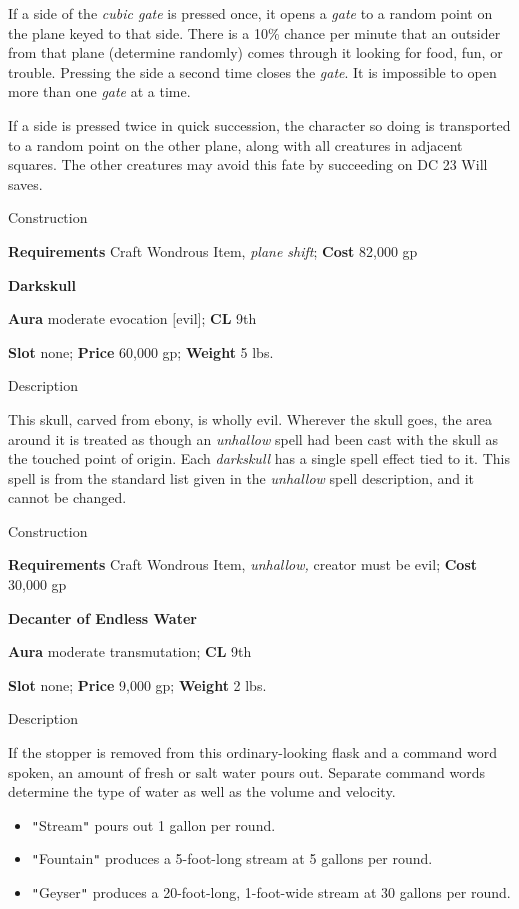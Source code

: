 If a side of the \textit{cubic gate }is pressed once, it opens a \textit{gate }to a random point on the plane keyed to that side. There is a 10\% chance per minute that an outsider from that plane (determine randomly) comes through it looking for food, fun, or trouble. Pressing the side a second time closes the \textit{gate}. It is impossible to open more than one \textit{gate }at a time.
				
If a side is pressed twice in quick succession, the character so doing is transported to a random point on the other plane, along with all creatures in adjacent squares. The other creatures may avoid this fate by succeeding on DC 23 Will saves. 
				
Construction
				
\textbf{Requirements} Craft Wondrous Item, \textit{plane shift}; \textbf{Cost }82,000 gp
				
\textbf{Darkskull}
				
\textbf{Aura} moderate evocation \mbox{$[$}evil\mbox{$]$};\textbf{ CL }9th
				
\textbf{Slot} none; \textbf{Price} 60,000 gp; \textbf{Weight} 5 lbs.
				
Description
				
This skull, carved from ebony, is wholly evil. Wherever the skull goes, the area around it is treated as though an \textit{unhallow }spell had been cast with the skull as the touched point of origin. Each \textit{darkskull }has a single spell effect tied to it. This spell is from the standard list given in the \textit{unhallow }spell description, and it cannot be changed. 
				
Construction
				
\textbf{Requirements} Craft Wondrous Item, \textit{unhallow,} creator must be evil; \textbf{Cost }30,000 gp
				
\textbf{Decanter of Endless Water}
				
\textbf{Aura} moderate transmutation;\textbf{ CL }9th
				
\textbf{Slot} none; \textbf{Price} 9,000 gp; \textbf{Weight} 2 lbs.
				
Description
				
If the stopper is removed from this ordinary-looking flask and a command word spoken, an amount of fresh or salt water pours out. Separate command words determine the type of water as well as the volume and velocity.
\begin{itemize}\item  \texttt{{}"{}}Stream\texttt{{}"{}} pours out 1 gallon per round.
\item  \texttt{{}"{}}Fountain\texttt{{}"{}} produces a 5-foot-long stream at 5 gallons per round.
\item  \texttt{{}"{}}Geyser\texttt{{}"{}} produces a 20-foot-long, 1-foot-wide stream at 30 gallons per round.
\end{itemize}
				

